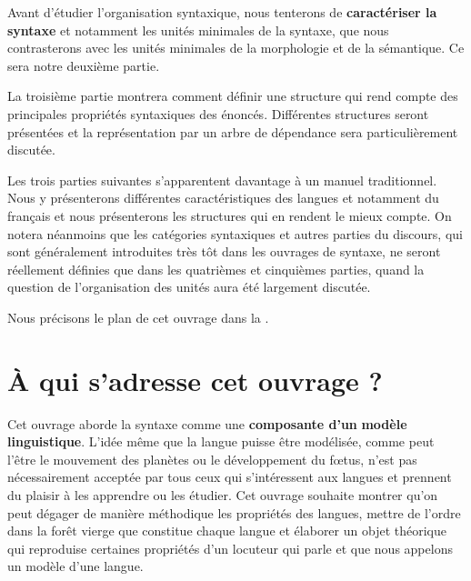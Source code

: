 Avant d’étudier l’organisation syntaxique, nous tenterons de \textbf{caractériser la syntaxe} et notamment les unités minimales de la syntaxe, que nous contrasterons avec les unités minimales de la morphologie et de la sémantique. Ce sera notre deuxième partie.

La troisième partie montrera comment définir une structure qui rend compte des principales propriétés syntaxiques des énoncés. Différentes structures seront présentées et la représentation par un arbre de dépendance sera particulièrement discutée.

Les trois parties suivantes s’apparentent davantage à un manuel traditionnel. Nous y présenterons différentes caractéristiques des langues et notamment du français et nous présenterons les structures qui en rendent le mieux compte. On notera néanmoins que les catégories syntaxiques et autres parties du discours, qui sont généralement introduites très tôt dans les ouvrages de syntaxe, ne seront réellement définies que dans les quatrièmes et cinquièmes parties, quand la question de l’organisation des unités aura été largement discutée.

Nous précisons le plan de cet ouvrage dans la .

\section{À qui s’adresse cet ouvrage ?}\label{sec:0.0.3}

Cet ouvrage aborde la syntaxe comme une \textbf{composante d’un} \textbf{modèle linguistique}. L’idée même que la langue puisse être modélisée, comme peut l’être le mouvement des planètes ou le développement du fœtus, n’est pas nécessairement acceptée par tous ceux qui s’intéressent aux langues et prennent du plaisir à les apprendre ou les étudier. Cet ouvrage souhaite montrer qu’on peut dégager de manière méthodique les propriétés des langues, mettre de l’ordre dans la forêt vierge que constitue chaque langue et élaborer un objet théorique qui reproduise certaines propriétés d’un locuteur qui parle et que nous appelons un modèle d’une langue.


